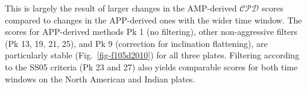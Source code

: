This is largely the result of larger changes in the AMP-derived $\mathcal{CPD}$
scores compared to changes in the APP-derived ones with the wider time window.
The scores for APP-derived methods Pk 1 (no filtering), other non-aggressive
filters (Pk 13, 19, 21, 25), and Pk 9 (correction for inclination flattening),
are particularly stable (Fig.~\ref{fig-f105d2010}) for all three plates.
Filtering according to the SS05 criteria (Pk 23 and 27) also yields comparable
scores for both time windows on the North American and Indian plates.

\begin{landscape}
\begin{table}[tbp]
\centering
\caption{Consistency check on comparisons of picking methods' performance between 20/10 and 10/5 Myr window/step. Notes: E means expected; UE means unexpected.}\label{tab-2010vs105F}
\end{table}
\end{landscape}
